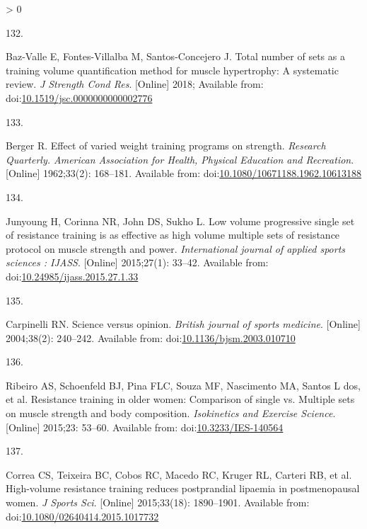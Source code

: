 \documentclass[twoside,10pt]{gihclass} %
\newlength{\cslhangindent}
\newlength{\csllabelwidth}
\newenvironment{CSLReferences}[3] %
 {%
  \setlength{\parindent}{0pt}
  \ifodd #1 \everypar{\setlength{\hangindent}{\cslhangindent}}\ignorespaces\fi
  \ifnum #2 > 0
  \setlength{\parskip}{#2\baselineskip}
  \fi
 }%
 {}
\newcommand{\CSLLeftMargin}[1]{\parbox[t]{\maxof{\widthof{#1}}{\csllabelwidth}}{#1}}
\newcommand{\CSLRightInline}[1]{\parbox[t]{\linewidth}{#1}}
\begin{document}
\begin{CSLReferences}{0}{0}
\leavevmode\hypertarget{ref-RN2130}{}%
\CSLLeftMargin{132. }
\CSLRightInline{Baz-Valle E, Fontes-Villalba M, Santos-Concejero J. Total number of sets as a training volume quantification method for muscle hypertrophy: A systematic review. \emph{J Strength Cond Res}. {[}Online{]} 2018; Available from: doi:\href{https://doi.org/10.1519/jsc.0000000000002776}{10.1519/jsc.0000000000002776}}

\leavevmode\hypertarget{ref-RN1476}{}%
\CSLLeftMargin{133. }
\CSLRightInline{Berger R. Effect of varied weight training programs on strength. \emph{Research Quarterly. American Association for Health, Physical Education and Recreation}. {[}Online{]} 1962;33(2): 168--181. Available from: doi:\href{https://doi.org/10.1080/10671188.1962.10613188}{10.1080/10671188.1962.10613188}}

\leavevmode\hypertarget{ref-RN2568}{}%
\CSLLeftMargin{134. }
\CSLRightInline{Junyoung H, Corinna NR, John DS, Sukho L. Low volume progressive single set of resistance training is as effective as high volume multiple sets of resistance protocol on muscle strength and power. \emph{International journal of applied sports sciences : IJASS}. {[}Online{]} 2015;27(1): 33--42. Available from: doi:\href{https://doi.org/10.24985/ijass.2015.27.1.33}{10.24985/ijass.2015.27.1.33}}

\leavevmode\hypertarget{ref-RN2201}{}%
\CSLLeftMargin{135. }
\CSLRightInline{Carpinelli RN. Science versus opinion. \emph{British journal of sports medicine}. {[}Online{]} 2004;38(2): 240--242. Available from: doi:\href{https://doi.org/10.1136/bjsm.2003.010710}{10.1136/bjsm.2003.010710}}

\leavevmode\hypertarget{ref-RN2465}{}%
\CSLLeftMargin{136. }
\CSLRightInline{Ribeiro AS, Schoenfeld BJ, Pina FLC, Souza MF, Nascimento MA, Santos L dos, et al. Resistance training in older women: Comparison of single vs. Multiple sets on muscle strength and body composition. \emph{Isokinetics and Exercise Science}. {[}Online{]} 2015;23: 53--60. Available from: doi:\href{https://doi.org/10.3233/IES-140564}{10.3233/IES-140564}}

\leavevmode\hypertarget{ref-RN2464}{}%
\CSLLeftMargin{137. }
\CSLRightInline{Correa CS, Teixeira BC, Cobos RC, Macedo RC, Kruger RL, Carteri RB, et al. High-volume resistance training reduces postprandial lipaemia in postmenopausal women. \emph{J Sports Sci}. {[}Online{]} 2015;33(18): 1890--1901. Available from: doi:\href{https://doi.org/10.1080/02640414.2015.1017732}{10.1080/02640414.2015.1017732}}


\end{CSLReferences}
\end{document}
